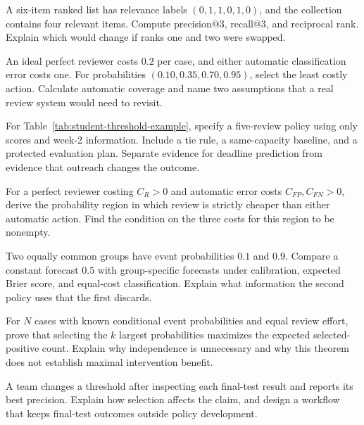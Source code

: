 \begin{exercises}
\item {}A six-item ranked list has relevance labels $(0,1,1,0,1,0)$, and the collection contains four relevant items. Compute precision@3, recall@3, and reciprocal rank. Explain which would change if ranks one and two were swapped.
\item {}An ideal perfect reviewer costs $0.2$ per case, and either automatic classification error costs one. For probabilities $(0.10,0.35,0.70,0.95)$, select the least costly action. Calculate automatic coverage and name two assumptions that a real review system would need to revisit.
\item {}For Table~\ref{tab:student-threshold-example}, specify a five-review policy using only scores and week-2 information. Include a tie rule, a same-capacity baseline, and a protected evaluation plan. Separate evidence for deadline prediction from evidence that outreach changes the outcome.
\end{exercises}

\par\noindent\begin{minipage}{\linewidth}
\begin{challengeexercises}
\item {}For a perfect reviewer costing $C_R>0$ and automatic error costs $C_{FP},C_{FN}>0$, derive the probability region in which review is strictly cheaper than either automatic action. Find the condition on the three costs for this region to be nonempty.
\item {}Two equally common groups have event probabilities $0.1$ and $0.9$. Compare a constant forecast $0.5$ with group-specific forecasts under calibration, expected Brier score, and equal-cost classification. Explain what information the second policy uses that the first discards.
\item {}For $N$ cases with known conditional event probabilities and equal review effort, prove that selecting the $k$ largest probabilities maximizes the expected selected-positive count. Explain why independence is unnecessary and why this theorem does not establish maximal intervention benefit.
\item {}A team changes a threshold after inspecting each final-test result and reports its best precision. Explain how selection affects the claim, and design a workflow that keeps final-test outcomes outside policy development.
\end{challengeexercises}
\end{minipage}\par

\clearpage
{\pagestyle{empty}\cleardoublepage}
\endgroup
